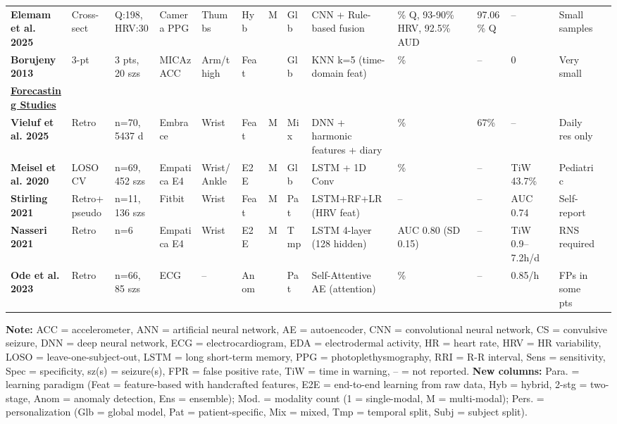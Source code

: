 \begin{landscape}
\begin{table}[htbp]
{\begin{tabular}{@{} l l l l l l >{\centering}p{0.7cm} >{\centering}p{0.6cm} >{\centering}p{0.7cm} >{\raggedright\arraybackslash}p{2.5cm} l l l >{\raggedright\arraybackslash}p{2.8cm} @{}}
\textbf{Elemam et al. 2025} & Cross-sect & Q:198, HRV:30 & Camera PPG & Thumbs & Hyb & M & Glb & CNN + Rule-based fusion & 95.1\% Q, 93-90\% HRV, 92.5\% AUD & 97.06\% Q & -- & Small samples \\
\addlinespace

\textbf{Borujeny 2013} & 3-pt & 3 pts, 20 szs & MICAz ACC & Arm/thigh & Feat & 1 & Glb & KNN k=5 (time-domain feat) & 100\% & -- & 0 & Very small \\
\addlinespace

\textbf{\underline{Forecasting Studies}} \\
\addlinespace

\textbf{Vieluf et al. 2025} & Retro & n=70, 5437 d & Embrace & Wrist & Feat & M & Mix & DNN + harmonic features + diary & 82\% & 67\% & -- & Daily res only \\
\addlinespace

\textbf{Meisel et al. 2020} & LOSO CV & n=69, 452 szs & Empatica E4 & Wrist/Ankle & E2E & M & Glb & LSTM + 1D Conv & 51.2\% & -- & TiW 43.7\% & Pediatric \\
\addlinespace

\textbf{Stirling 2021} & Retro+pseudo & n=11, 136 szs & Fitbit & Wrist & Feat & M & Pat & LSTM+RF+LR (HRV feat) & -- & -- & AUC 0.74 & Self-report \\
\addlinespace

\textbf{Nasseri 2021} & Retro & n=6 & Empatica E4 & Wrist & E2E & M & Tmp & LSTM 4-layer (128 hidden) & AUC 0.80 (SD 0.15) & -- & TiW 0.9--7.2h/d & RNS required \\
\addlinespace

\textbf{Ode et al. 2023} & Retro & n=66, 85 szs & ECG & -- & Anom & 1 & Pat & Self-Attentive AE (attention) & 74\% & -- & 0.85/h & FPs in some pts \\
\bottomrule
\end{tabular}%
}
\par\medskip
\footnotesize
\textbf{Note:} ACC = accelerometer, ANN = artificial neural network, AE = autoencoder, CNN = convolutional neural network, CS = convulsive seizure, DNN = deep neural network, ECG = electrocardiogram, EDA = electrodermal activity, HR = heart rate, HRV = HR variability, LOSO = leave-one-subject-out, LSTM = long short-term memory, PPG = photoplethysmography, RRI = R-R interval, Sens = sensitivity, Spec = specificity, sz(s) = seizure(s), FPR = false positive rate, TiW = time in warning, -- = not reported. \textbf{New columns:} Para. = learning paradigm (Feat = feature-based with handcrafted features, E2E = end-to-end learning from raw data, Hyb = hybrid, 2-stg = two-stage, Anom = anomaly detection, Ens = ensemble); Mod. = modality count (1 = single-modal, M = multi-modal); Pers. = personalization (Glb = global model, Pat = patient-specific, Mix = mixed, Tmp = temporal split, Subj = subject split).
\end{table}
\end{landscape}

